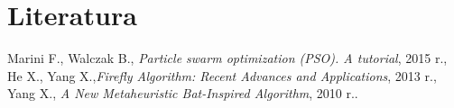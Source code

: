 \section{Literatura}

\begingroup
  \renewcommand{\section}[2]{}
  \begin{thebibliography}{9}
     Marini F., Walczak B., \textit{Particle swarm optimization (PSO). A tutorial}, 2015 r., 
     He X., Yang X.,\textit{Firefly Algorithm: Recent Advances and Applications}, 2013 r.,
     Yang X., \textit{A New Metaheuristic Bat-Inspired Algorithm}, 2010 r.. 
  \end{thebibliography}
\endgroup

